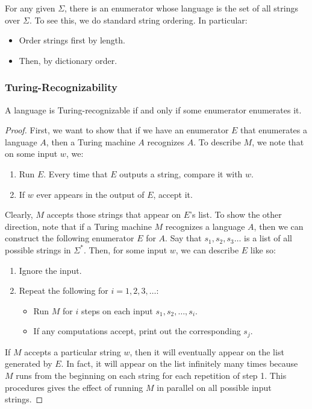 \documentclass[letterpaper]{article}
\begin{document}
For any given $\Sigma$, there is an enumerator whose language is the set of all strings over $\Sigma$. To see this, we do standard string ordering. In particular: 
\begin{itemize}
    \item Order strings first by length. 
    \item Then, by dictionary order. 
\end{itemize}

\subsubsection{Turing-Recognizability}
\begin{theorem}{}{}
    A language is Turing-recognizable if and only if some enumerator enumerates it. 
\end{theorem}

\begin{mdframed}[]
    \begin{proof}
        First, we want to show that if we have an enumerator $E$ that enumerates a language $A$, then a Turing machine $A$ recognizes $A$. To describe $M$, we note that on some input $w$, we: 
        \begin{enumerate}
            \item Run $E$. Every time that $E$ outputs a string, compare it with $w$. 
            \item If $w$ ever appears in the output of $E$, accept it. 
        \end{enumerate}
        Clearly, $M$ accepts those strings that appear on $E$'s list. To show the other direction, note that if a Turing machine $M$ recognizes a language $A$, then we can construct the following enumerator $E$ for $A$. Say that $s_1, s_2, s_3 \dots$ is a list of all possible strings in $\Sigma^*$. Then, for some input $w$, we can describe $E$ like so:
        \begin{enumerate}
            \item Ignore the input. 
            \item Repeat the following for $i = 1, 2, 3, \dots$: 
            \begin{itemize}
                \item Run $M$ for $i$ steps on each input $s_1, s_2, \dots, s_i$. 
                \item If any computations accept, print out the corresponding $s_j$.
            \end{itemize}
        \end{enumerate}
        If $M$ accepts a particular string $w$, then it will eventually appear on the list generated by $E$. In fact, it will appear on the list infinitely many times because $M$ runs from the beginning on each string for each repetition of step 1. This procedures gives the effect of running $M$ in parallel on all possible input strings. 
    \end{proof}
\end{mdframed}
\end{document}
